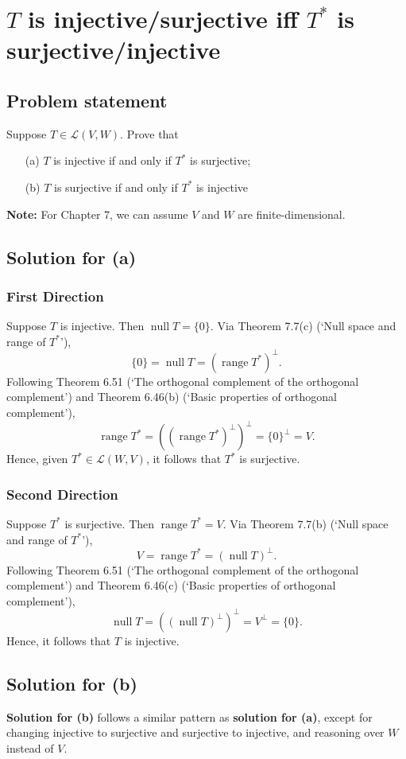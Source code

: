 \documentclass{article}
\begin{document}
\clearpage

\section{$T$ is injective/surjective iff $T^*$ is surjective/injective}
\subsection*{Problem statement}
Suppose $T\in\mathcal{L}(V,W)$. Prove that
\begin{enumerate}
  \item[(a)] $T$ is injective if and only if $T^*$ is surjective;
  \item[(b)] $T$ is surjective if and only if $T^*$ is injective
\end{enumerate}
\textbf{Note:} For Chapter 7, we can assume $V$ and $W$ are finite-dimensional.

\subsection*{Solution for (a)}
\subsubsection*{First Direction}
Suppose $T$ is injective. Then $\operatorname{null}T=\{0\}$. Via Theorem 7.7(c) (`Null space and range of $T^*$'), 
\[\{0\}=\operatorname{null}T=(\operatorname{range}T^*)^\bot.\]
Following Theorem 6.51 (`The orthogonal complement of the orthogonal complement') and Theorem 6.46(b) (`Basic properties of orthogonal complement'), 
\[\operatorname{range}T^*=((\operatorname{range}T^*)^\bot)^\bot=\{0\}^\bot=V.\]
Hence, given $T^*\in\mathcal{L}(W,V)$, it follows that $T^*$ is surjective.

\subsubsection*{Second Direction}
Suppose $T^*$ is surjective. Then $\operatorname{range}T^*=V$. Via Theorem 7.7(b) (`Null space and range of $T^*$'), 
\[V=\operatorname{range}T^*=(\operatorname{null}T)^\bot.\]
Following Theorem 6.51 (`The orthogonal complement of the orthogonal complement') and Theorem 6.46(c) (`Basic properties of orthogonal complement'), 
\[\operatorname{null}T=((\operatorname{null}T)^\bot)^\bot=V^\bot=\{0\}.\]
Hence, it follows that $T$ is injective.

\subsection*{Solution for (b)}
\textbf{Solution for (b)} follows a similar pattern as \textbf{solution for (a)}, except for changing injective to surjective and surjective to injective, and reasoning over $W$ instead of $V$.
\end{document}
